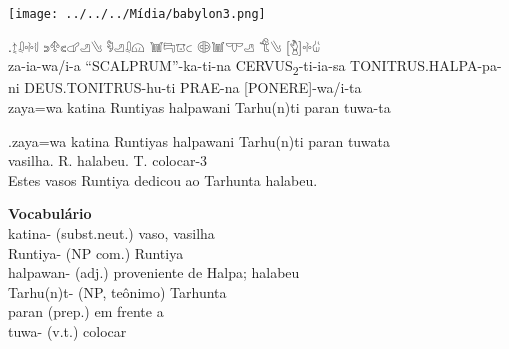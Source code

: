 \clearpage

\begin{center}
	\texttt{[image: ../../../Mídia/babylon3.png]}
\end{center}
\exg.{\Large 𔖪𔓱𔗬𔗷} {\Large 𔗎𔔯𔗏𔗧𔑣𔐤} {\Large 𔑵𔑣𔓱𔗔} {\Large 𔓢𔑞𔕸𔗐} {\Large 𔖖𔓢𔕙𔑣}
{\Large 𔐎𔐤} {\Large [𔑇]𔗬𔑰}\\
za-ia-wa\slash{}i-a\hspace{10pt} ``SCALPRUM''-ka-ti-na\hspace{10pt}
CERVUS\textsubscript{2}-ti-ia-sa\hspace{10pt} TONITRUS.HALPA-pa-ni\hspace{10pt}
DEUS.TONITRUS-hu-ti\hspace{10pt} PRAE-na\hspace{10pt} [PONERE]-wa/i-ta\\
zaya=wa katina Runtiyas halpawani Tarhu{(n)}ti paran tuwa-ta

\exg.zaya=wa katina Runtiyas halpawani Tarhu{(n)}ti paran tuwata\\
\Det{}\Acu{}\Pl{} vasilha.\Neut{}\Acu{}\Pl{} R.\Com{}\Nom{}\Sg{} halabeu.\Com{}\Dat{}\Sg{} T.\Com{}\Dat{}\Sg{} \Prep{} colocar-3\Sg\\
Estes vasos Runtiya dedicou ao Tarhunta halabeu.


\noindent\textbf{Vocabulário}\\
\noindent katina- (subst.neut.) vaso, vasilha\\
Runtiya- (NP com.) Runtiya\\
halpawan- (adj.) proveniente de Halpa; halabeu\\
Tarhu{(n)}t- (NP, teônimo) Tarhunta\\
paran (prep.) em frente a\\
tuwa- (v.t.) colocar
